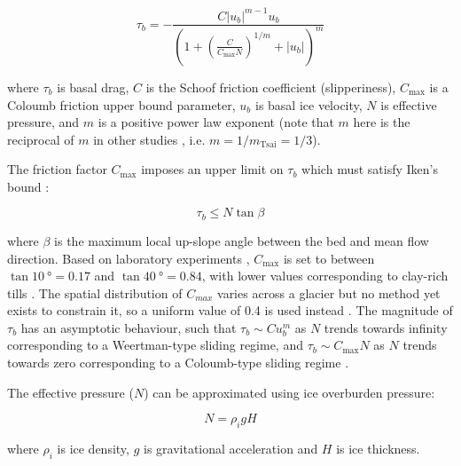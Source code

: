 \begin{equation}
  \tau_b = -\frac{C |u_b|^{m-1} u_b}{\left(1 + \left(\frac{C}{C_{\text{max}}N}\right)^{1/m} + |u_b|\right)^m} \label{eq:schoof}
\end{equation}

where $\tau_b$ is basal drag, $C$ is the Schoof friction coefficient (slipperiness), $C_{\text{max}}$ is a Coloumb friction upper bound parameter, $u_b$ is basal ice velocity, $N$ is effective pressure, and $m$ is a positive power law exponent (note that $m$ here is the reciprocal of $m$ in other studies \citep[e.g.][]{TsaiMarineicesheetprofiles2015}, i.e. $m = 1/m_{\text{Tsai}} = 1/3$).

The friction factor $C_{\text{max}}$ imposes an upper limit on $\tau_b$ which must satisfy Iken's bound \citep{IkenEffectSubglacialWater1981,GagliardiniFiniteelementmodelingsubglacial2007}:

\begin{equation}
  \tau_b \leq N\tan\beta
\end{equation}

where $\beta$ is the maximum local up-slope angle between the bed and mean flow direction.
Based on laboratory experiments \citep{IversonRingshearstudiestill1998}, $C_{\text{max}}$ is set to between $\tan \SI{10}{\degree} = 0.17$ and $\tan \SI{40}{\degree} = 0.84$, with lower values corresponding to clay-rich tills \citep[, pp.266-267]{Cuffeyphysicsglaciers2010}.
The spatial distribution of $C_{max}$ varies across a glacier but no method yet exists to constrain it, so a uniform value of 0.4 is used instead \citep[0.4 and 0.6 was used in][]{BrondexSensitivitycentennialmass2019}.
The magnitude of $\tau_b$ has an asymptotic behaviour, such that $\tau_b \sim C u_b^m$ as $N$ trends towards infinity corresponding to a Weertman-type sliding regime, and $\tau_b \sim C_{\text{max}} N$ as $N$ trends towards zero corresponding to a Coloumb-type sliding regime \citep{BrondexSensitivitygroundingline2017}.

The effective pressure ($N$) can be approximated using ice overburden pressure:

\begin{equation}
  N = \rho_i g H
\end{equation}

where $\rho_i$ is ice density, $g$ is gravitational acceleration and $H$ is ice thickness.

